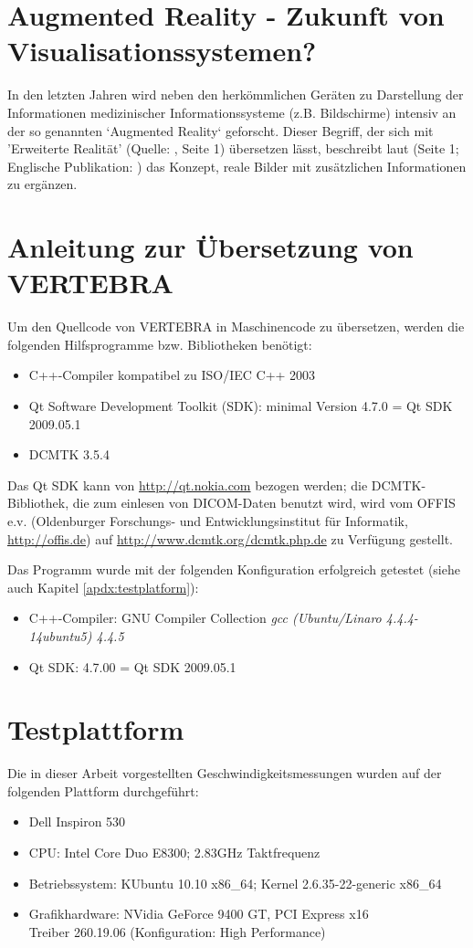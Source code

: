 \documentclass[a4paper,titlepage,12pt]{scrartcl}
\begin{document}
\section{Augmented Reality - Zukunft von Visualisationssystemen?}\label{sec:augmentedreality}
In den letzten Jahren wird neben den herkömmlichen Geräten zu Darstellung der Informationen medizinischer Informationssysteme (z.B. Bildschirme) intensiv an der so genannten `Augmented Reality` geforscht. Dieser Begriff, der sich mit 'Erweiterte Realität' (Quelle: \cite{Toe2010}, Seite 1) übersetzen lässt, beschreibt laut \cite{Suthau2002DE} (Seite 1; Englische Publikation: \cite{Suthau2002}) das Konzept, reale Bilder mit zusätzlichen Informationen zu ergänzen.

\appendix \label{appendixstart}
\section{Anleitung zur Übersetzung von VERTEBRA}
Um den Quellcode von VERTEBRA in Maschinencode zu übersetzen, werden die folgenden Hilfsprogramme bzw. Bibliotheken benötigt:
\begin{itemize}
 \item C++-Compiler kompatibel zu ISO/IEC C++ 2003
 \item Qt Software Development Toolkit (SDK): minimal Version 4.7.0 = Qt SDK 2009.05.1
 \item DCMTK 3.5.4
\end{itemize}

Das Qt SDK kann von \url{http://qt.nokia.com} bezogen werden; die DCMTK-Bibliothek, die zum einlesen von DICOM-Daten benutzt wird, wird vom OFFIS e.v. (Oldenburger Forschungs- und Entwicklungsinstitut für Informatik, \url{http://offis.de}) auf \url{http://www.dcmtk.org/dcmtk.php.de} zu Verfügung gestellt.

Das Programm wurde mit der folgenden Konfiguration erfolgreich getestet (siehe auch Kapitel \vref{apdx:testplatform}):
\begin{itemize}
 \item C++-Compiler: GNU Compiler Collection \textit{gcc (Ubuntu/Linaro 4.4.4-14ubuntu5) 4.4.5}
 \item Qt SDK: 4.7.00 = Qt SDK 2009.05.1
\end{itemize}

\section{Testplattform}\label{apdx:testplatform}
Die in dieser Arbeit vorgestellten Geschwindigkeitsmessungen wurden auf der folgenden Plattform durchgeführt:
\begin{itemize}
  \item Dell Inspiron 530
  \item CPU: Intel\textsuperscript{\textregistered} Core Duo E8300; 2.83GHz Taktfrequenz
  \item Betriebssystem: KUbuntu 10.10 x86\_64; Kernel 2.6.35-22-generic x86\_64
  \item Grafikhardware: NVidia\textsuperscript{\textregistered} GeForce 9400 GT, PCI Express x16\\
	Treiber 260.19.06 (Konfiguration: High Performance)
\end{itemize}
\end{document}
